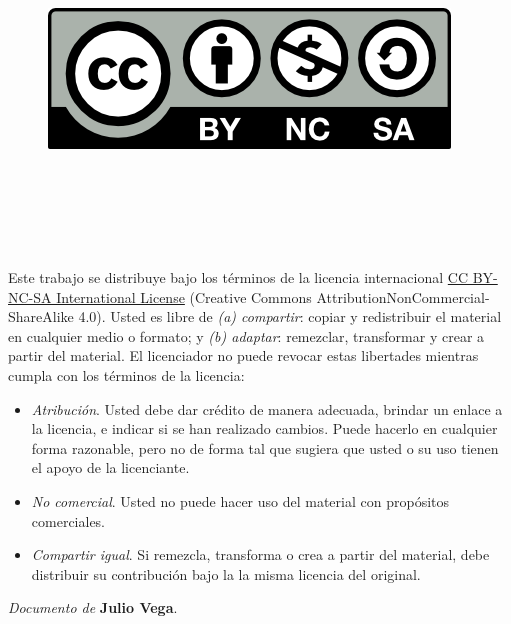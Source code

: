
\cleardoublepage

\begin{figure}
 \ \ \ \ \includegraphics[width=0.25\linewidth]{figs/by-nc-sa.png}
 \label{fig:cc} 
 \end{figure}

\

\

\

\noindent
Este trabajo se distribuye bajo los términos de la licencia internacional \href{http://creativecommons.org/licenses/by-nc-sa/4.0/}{CC BY-NC-SA International License} (Creative Commons AttributionNonCommercial-ShareAlike 4.0). Usted es libre de \textit{(a) compartir}: copiar y redistribuir el material en cualquier medio o formato; y \textit{(b) adaptar}: remezclar, transformar y crear a partir del material. El licenciador no puede revocar estas libertades mientras cumpla con los términos de la licencia:

\begin{itemize}
\item \textit{Atribución}. Usted debe dar crédito de manera adecuada, brindar un enlace a la licencia, e indicar si se han realizado cambios. Puede hacerlo en cualquier forma razonable, pero no de forma tal que sugiera que usted o su uso tienen el apoyo de la licenciante.
\item \textit{No comercial}. Usted no puede hacer uso del material con propósitos comerciales.
\item \textit{Compartir igual}. Si remezcla, transforma o crea a partir del material, debe distribuir su contribución bajo la la misma licencia del original.
\end{itemize}

\begin{flushright}
		\vspace{7.0 cm}
		\emph{Documento de} \textbf{Julio Vega}. %
\end{flushright}

